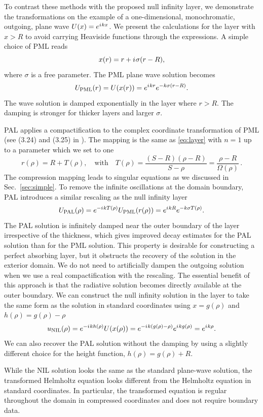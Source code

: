 \documentclass[final,onefignum,onetabnum]{siamart190516}
\newcommand{\be}{\begin{equation}}
\newcommand{\ee}{\end{equation}}
\newcommand{\iu}{{i\mkern1mu}}
\begin{document}
To contrast these methods with the proposed null infinity layer, we demonstrate the transformations on the example of a one-dimensional, monochromatic, outgoing, plane wave $U(x)=e^{\iu kx}$. We present the calculations for the layer with $x>R$ to avoid carrying Heaviside functions through the expressions. A simple choice of PML reads 
\be\label{eq:pml} x(r) = r + \iu \sigma (r-R), \ee
where $\sigma$ is a free parameter. The PML plane wave solution becomes
\[ U_{\mathrm{PML}}(r) = U(x(r)) = e^{\iu k r} e^{- k \sigma (r-R)}. \]
The wave solution is damped exponentially in the layer where $r>R$. The damping is stronger for thicker layers and larger $\sigma$.

PAL applies a compactification to the complex coordinate transformation of PML (see (3.24) and (3.25) in \cite{yang2021truly}). The mapping is the same as \eqref{eq:layer} with $n=1$ up to a parameter which we set to one 
\[ r(\rho) = R + T(\rho), \quad \mathrm{with} \quad T(\rho) = \frac{(S-R)(\rho-R)}{S-\rho} = \frac{\rho-R}{\Omega(\rho)}\,. \]
The compression mapping leads to singular equations as we discussed in Sec.~\ref{sec:simple}. To remove the infinite oscillations at the domain boundary, PAL introduces a similar rescaling as the null infinity layer
\[ U_{\mathrm{PAL}}(\rho) = e^{-\iu k T(\rho)} U_{\mathrm{PML}}(r(\rho)) = e^{\iu k R} e^{-k \sigma T(\rho)}. \]
The PAL solution is infinitely damped near the outer boundary of the layer irrespective of the thickness, which gives improved decay estimates for the PAL solution than for the PML solution. This property is desirable for constructing a perfect absorbing layer, but it obstructs the recovery of the solution in the exterior domain. We do not need to artificially dampen the outgoing solution when we use a real compactification with the rescaling. The essential benefit of this approach is that the radiative solution becomes directly available at the outer boundary. We can construct the null infinity solution in the layer to take the same form as the solution in standard coordinates using $x=g(\rho)$ and $h(\rho) = g(\rho) - \rho$
\[ u_{\mathrm{NIL}}(\rho) = e^{-\iu k h(\rho)} U(x(\rho)) = e^{-\iu k (g(\rho)-\rho)} e^{\iu k g(\rho)} = e^{\iu k \rho}. \]
We can also recover the PAL solution without the damping by using a slightly different choice for the height function,  $h(\rho) = g(\rho) + R$.  

While the NIL solution looks the same as the standard plane-wave solution, the transformed Helmholtz equation looks different from the Helmholtz equation in standard coordinates. In particular, the transformed equation is regular throughout the domain in compressed coordinates and does not require boundary data. 
\end{document}
